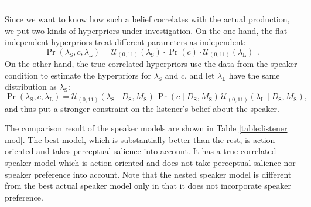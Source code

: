 \vspace{1cm}
\hrule
\vspace{1cm}



 Since we want to know how such a belief correlates with the
actual production, we put two kinds of hyperpriors under
investigation. On the one hand, the flat-independent hyperpriors treat
different parameters as independent:
\begin{equation}\label{hyper-listener-independent}
\Pr(\lambda_\mathrm{S},c,\lambda_\mathrm{L})=\mathcal{U}_{(0,11)}(\lambda_\mathrm{S}) \cdot \Pr(c) \cdot  \mathcal{U}_{(0,11)}( \lambda_\mathrm{L}) \enspace .
\end{equation}
On the other hand, the true-correlated hyperpriors use the data from the speaker condition to estimate the hyperpriors for $\lambda_\mathrm{S}$ and $c$, and let $\lambda_\mathrm{L}$ have the same distribution as $\lambda_\mathrm{S}$:
\begin{equation}\label{hyper-listener-independent}
\Pr(\lambda_\mathrm{S},c,\lambda_\mathrm{L})=\mathcal{U}_{(0,11)}(\lambda_\mathrm{S} \mid D_\mathrm{S}, M_\mathrm{S}) \,\Pr(c\mid D_\mathrm{S}, M_\mathrm{S})  \,\mathcal{U}_{(0,11)}( \lambda_\mathrm{L} \mid D_\mathrm{S}, M_\mathrm{S}),
\end{equation}
and thus put a stronger constraint on the listener's belief about the speaker. 

The comparison result of the speaker models are shown in Table \ref{table:listener mod}. The best model, which is substantially better than the rest, is action-oriented and takes perceptual salience into account. It has a true-correlated speaker model which is action-oriented and does not take perceptual salience nor speaker preference into account. Note that the nested speaker model is different from the best actual speaker model only in that it does not incorporate speaker preference.  


